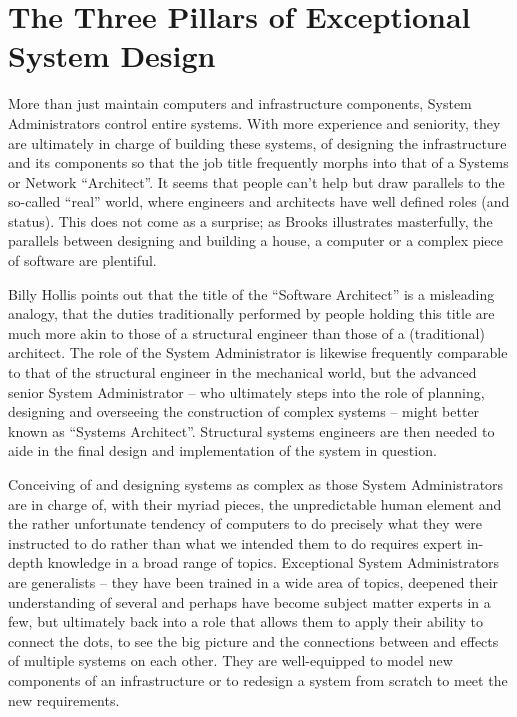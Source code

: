 \section{The Three Pillars of Exceptional System Design}
\label{introduction:pillars}

More than just maintain computers and infrastructure
components, System Administrators control entire
systems.  With more experience and seniority, they are
ultimately in charge of building these systems, of
designing the infrastructure and its components so
that the job title frequently morphs into that of a
Systems or Network ``Architect''.  It seems that
people can't help but draw parallels to the so-called
``real'' world, where engineers and architects have
well defined roles (and status).  This does not come
as a surprise; as Brooks\cite{intro:brooks-design}
illustrates masterfully, the parallels between
designing and building a house, a computer or a
complex piece of software are plentiful.

Billy Hollis points
out\cite{intro:hollis} that the title of the
``Software Architect'' is a misleading analogy, that
the duties traditionally performed by people holding
this title are much more akin to those of a structural
engineer than those of a (traditional) architect.  The
role of the System Administrator is likewise
frequently comparable to that of the structural
engineer in the mechanical world, but the advanced
senior System Administrator -- who ultimately steps
into the role of planning, designing and overseeing
the construction of complex systems -- might better
known as ``Systems Architect''.  Structural systems
engineers are then needed to aide in the final design
and implementation of the system in question.

Conceiving of and designing systems as complex as
those System Administrators are in charge of, with
their myriad pieces, the unpredictable human element
and the rather unfortunate tendency of computers to do
precisely what they were instructed to do rather than
what we intended them to do requires expert in-depth
knowledge in a broad range of topics.  Exceptional
System Administrators are generalists -- they have
been trained in a wide area of topics, deepened their
understanding of several and perhaps have become
subject matter experts in a few, but ultimately back
into a role that allows them to apply their ability to
connect the dots, to see the big picture and the
connections between and effects of multiple systems on
each other.  They are well-equipped to model new
components of an infrastructure or to redesign a
system from scratch to meet the new requirements.

